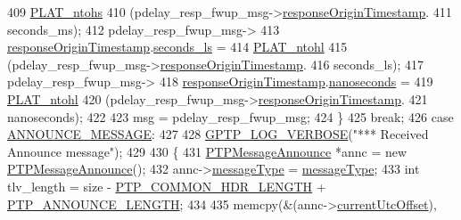 \begin{DoxyCode}
{{{{{{{{409                 \hyperlink{linux_2src_2platform_8cpp_a6b8f3e7b87b66fa774a07ddc67f883a7}{PLAT\_ntohs}
410                 (pdelay\_resp\_fwup\_msg->\hyperlink{class_p_t_p_message_path_delay_resp_follow_up_ace95ddb3f03eb3b4fcf8f73281dc0ee3}{responseOriginTimestamp}.
411                  seconds\_ms);
412             pdelay\_resp\_fwup\_msg->
413                 \hyperlink{class_p_t_p_message_path_delay_resp_follow_up_ace95ddb3f03eb3b4fcf8f73281dc0ee3}{responseOriginTimestamp}.\hyperlink{class_timestamp_a2bf200e58cd268d8b86cf93c51500a44}{seconds\_ls} =
414                 \hyperlink{linux_2src_2platform_8cpp_ad335681c3444e0406899693a6f782173}{PLAT\_ntohl}
415                 (pdelay\_resp\_fwup\_msg->\hyperlink{class_p_t_p_message_path_delay_resp_follow_up_ace95ddb3f03eb3b4fcf8f73281dc0ee3}{responseOriginTimestamp}.
416                  seconds\_ls);
417             pdelay\_resp\_fwup\_msg->
418                 \hyperlink{class_p_t_p_message_path_delay_resp_follow_up_ace95ddb3f03eb3b4fcf8f73281dc0ee3}{responseOriginTimestamp}.\hyperlink{class_timestamp_a78ae11d98fcfe738239d0a853d82c84a}{nanoseconds} =
419                 \hyperlink{linux_2src_2platform_8cpp_ad335681c3444e0406899693a6f782173}{PLAT\_ntohl}
420                 (pdelay\_resp\_fwup\_msg->\hyperlink{class_p_t_p_message_path_delay_resp_follow_up_ace95ddb3f03eb3b4fcf8f73281dc0ee3}{responseOriginTimestamp}.
421                  nanoseconds);
422 
423             msg = pdelay\_resp\_fwup\_msg;
424         \}
425         \textcolor{keywordflow}{break};
426     \textcolor{keywordflow}{case} \hyperlink{avbts__message_8hpp_ac6606ebe91c8ac66a2c314c79f5ab013a4c8d615c4de8a7fc2ea24b5eff2811ef}{ANNOUNCE\_MESSAGE}:
427 
428         \hyperlink{gptp__log_8hpp_add03384a2a8099b27e07d041cce77e6f}{GPTP\_LOG\_VERBOSE}(\textcolor{stringliteral}{"*** Received Announce message"});
429 
430         \{
431             \hyperlink{class_p_t_p_message_announce}{PTPMessageAnnounce} *annc = \textcolor{keyword}{new} \hyperlink{class_p_t_p_message_announce}{PTPMessageAnnounce}();
432             annc->\hyperlink{class_p_t_p_message_common_adb32627aa5b0e2dbad3ccd88aab07c05}{messageType} = \hyperlink{class_p_t_p_message_common_adb32627aa5b0e2dbad3ccd88aab07c05}{messageType};
433             \textcolor{keywordtype}{int} tlv\_length = size - \hyperlink{avbts__message_8hpp_a8ec4d965b7b1e83844f1c17f12e9b8e4}{PTP\_COMMON\_HDR\_LENGTH} + 
      \hyperlink{avbts__message_8hpp_ad800b5cd5359d021054af8e902100ba7}{PTP\_ANNOUNCE\_LENGTH};
434 
435             memcpy(&(annc->\hyperlink{class_p_t_p_message_announce_a4ee8eca04b1ccd7d8eaae5f0dd3a11fa}{currentUtcOffset}),
}}}}}}}}
\end{DoxyCode}
